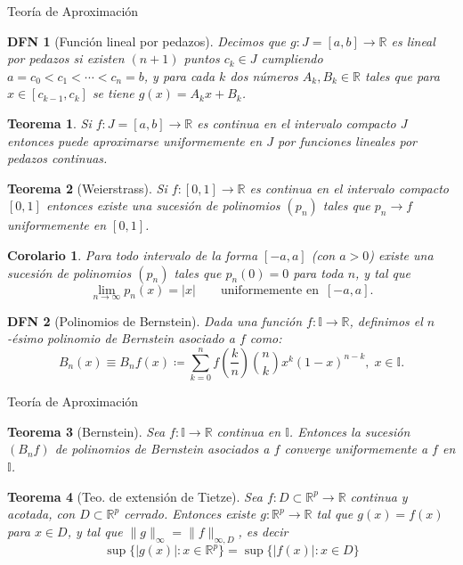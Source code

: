 \documentclass[a4paper]{article}\usepackage{/home/alonso/Documents/Projects/formularios/styles}
\newtheorem{definition}{DFN}
\theoremstyle{mytheoremstyle}
\newtheorem{theorem}{Teorema}
\newtheorem{cor}{Corolario}[theorem]
\newcommand{\R}{\mathbb{R}}
\newcommand{\I}{\mathbb{I}}
\newcommand{\1}{\mathds{1}}
\begin{document}
\begin{multicols*}{3}
\begin{roundbox}{Teoría de Aproximación}
\begin{definition}[Función lineal por pedazos]
Decimos que $g:J=[a,b]\to\R$ es lineal por pedazos si existen $(n+1)$ puntos $c_k\in J$ cumpliendo $a=c_0<c_1<\cdots<c_n=b$, y para cada $k$ dos números $A_k,B_k\in\R$ tales que para $x\in[c_{k-1},c_k]$ se tiene $g(x)=A_kx+B_k$.
\end{definition}

\begin{theorem}
Si $f:J=[a,b]\to\R$ es continua en el intervalo compacto $J$ entonces puede aproximarse uniformemente en $J$ por funciones lineales por pedazos continuas.
\end{theorem}

\begin{theorem}[Weierstrass]
Si $f:[0,1]\to\R$ es continua en el intervalo compacto $[0,1]$ entonces existe una sucesión de polinomios $(p_n)$ tales que $p_n\to f$ uniformemente en $[0,1]$.
\end{theorem}

\begin{cor}
Para todo intervalo de la forma $[-a,a]$ (con $a>0$) existe una sucesión de polinomios $(p_n)$ tales que $p_n(0)=0$ para toda $n$, y tal que
\[
\lim_{n\to\infty}p_n(x)=|x|\qquad\text{uniformemente en }\,[-a,a].
\]
\end{cor}

\begin{definition}[Polinomios de Bernstein]
    Dada una función $f: \I \to \R$, definimos el $n$-ésimo polinomio de Bernstein asociado a $f$ como:
    \[
        B_n(x) \equiv B_n f(x) \coloneqq \sum_{k=0}^{n} f\left( \frac{k}{n} \right) \binom{n}{k} x^{k} (1-x)^{n-k}, \; x \in \I.
    \]
\end{definition}
\end{roundbox}

\begin{roundbox}{Teoría de Aproximación}
\begin{theorem}[Bernstein]
Sea $f:\I\to\R$ continua en $\I$. Entonces la sucesión $(B_nf)$ de polinomios de Bernstein asociados a $f$ converge uniformemente a $f$ en $\I$.
\end{theorem}

\begin{theorem}[Teo. de extensión de Tietze]
Sea $f:D\subset\R^{p}\to\R$ continua y acotada, con $D\subset\R^{p}$ cerrado.
Entonces existe $g:\R^{p}\to\R$ tal que $g(x)=f(x)$ para $x\in D$, y tal que $\|g\|_{\infty}=\|f\|_{\infty,D}$, es decir
\[
\sup\big\{|g(x)|:x\in\R^{p}\big\}=\sup\big\{|f(x)|:x\in D\big\}
\]
\end{theorem}


\end{roundbox}
\end{multicols*}
\end{document}
